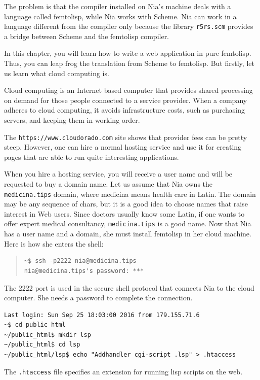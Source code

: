 \documentclass[a4paper,12pt]{book}
\begin{document}
The problem is that the
compiler installed on
Nia's machine deals with a language
called femtolisp, while Nia 
works with  Scheme. Nia can work in a
language different from the compiler
only because the library \verb|r5rs.scm| provides
a bridge between Scheme and the
femtolisp compiler.


In this chapter, you will learn how
to write a web application in pure
femtolisp. Thus, you can leap frog
the translation from Scheme to femtolisp.
But firstly,
let us learn what cloud computing is.

Cloud computing is an Internet based
computer that provides shared
processing  on demand for those people
connected to a service provider.
When a  company adheres to cloud computing,
it avoids infrastructure costs,
such as purchasing servers, and keeping
them in working order.

The \verb|https://www.cloudorado.com|
site shows that provider fees
can be pretty steep.
However, one can hire a normal
hosting service and use it for
creating pages that are able to
run quite interesting applications.

When you hire a hosting service,
you will receive a user name and
will be requested to
buy a domain name. Let us
assume that Nia owns the
\verb|medicina.tips| domain,
where {\sc medicina} means
health care in Latin. The domain
may be any sequence of chars,
but it is a good idea to choose
names that raise interest in
Web users. Since doctors usually
know some Latin, if one wants to offer
expert medical consultancy, \verb|medicina.tips|
is a good name.
Now that Nia has a user name and a
domain, she must install femtolisp
in her cloud machine. Here is how
she enters the shell:
\begin{quote}
\begin{verbatim}
~$ ssh -p2222 nia@medicina.tips
nia@medicina.tips's password: ***
\end{verbatim}
\end{quote}
The 2222 port is used in the secure shell protocol
that connects Nia to the cloud computer.
She needs a password to complete the connection.
\begin{Verbatim}[fontsize=\small,
frame=single,
framerule=0.5mm]
Last login: Sun Sep 25 18:03:00 2016 from 179.155.71.6
~$ cd public_html
~/public_html$ mkdir lsp
~/public_html$ cd lsp
~/public_html/lsp$ echo "Addhandler cgi-script .lsp" > .htaccess
\end{Verbatim}
The \verb|.htaccess| file specifies 
an extension for running lisp scripts on the web.
\end{document}
